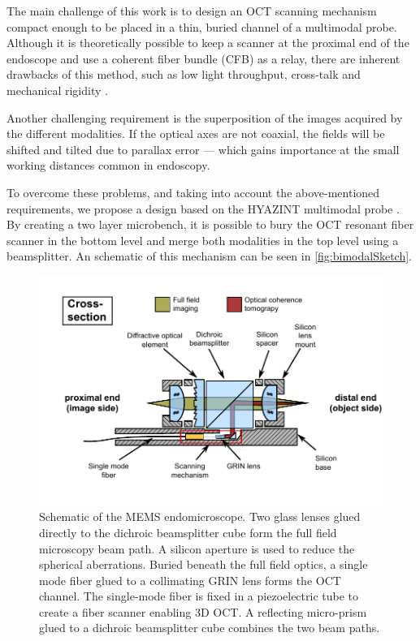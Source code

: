 The main challenge of this work is to design an OCT scanning mechanism compact enough to be placed in a thin, buried channel of a multimodal probe.  Although it is theoretically possible to keep a scanner at the proximal end of the endoscope and use a coherent fiber bundle (CFB) as a relay, there are inherent drawbacks of this method, such as low light throughput, cross-talk and mechanical rigidity \cite{Ford2009}. 

Another challenging requirement is the superposition of the images acquired by the different modalities. If the optical axes are not coaxial, the fields will be shifted and tilted due to parallax error --- which gains importance at the small working distances common in endoscopy.

To overcome these problems, and taking into account the above-mentioned requirements, we propose a design based on the HYAZINT multimodal probe \cite{Kretschmer}. By creating a two layer microbench, it is possible to bury the OCT resonant fiber scanner in the bottom level and merge both modalities in the top level using a beamsplitter. An schematic of this mechanism can be seen in \autoref{fig:bimodalSketch}.

\begin{figure}[h!]\centering
      \includegraphics{figures/30_DesignSimulation/Overview/crossSection.pdf}
      \caption{Schematic of the MEMS endomicroscope. Two glass lenses glued directly to the dichroic beamsplitter cube form the full field microscopy beam path. A silicon aperture is used to reduce the spherical aberrations. Buried beneath the full field optics, a single mode fiber glued to a collimating GRIN lens forms the OCT channel. The single-mode fiber is fixed in a piezoelectric tube to create a fiber scanner enabling 3D OCT. A reflecting micro-prism glued to a dichroic beamsplitter cube combines the two beam paths.}
      \label{fig:bimodalSketch}
\end{figure}

